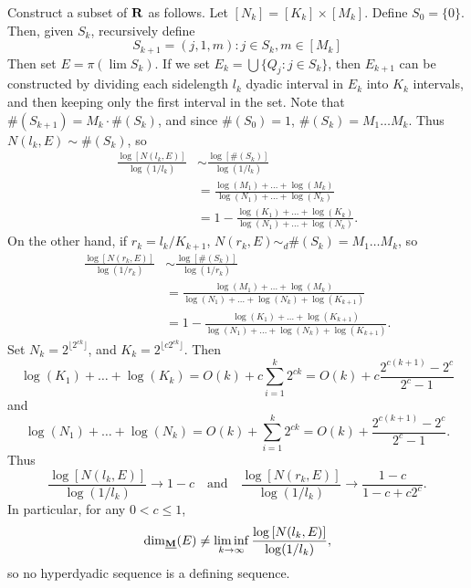 \begin{example}
	Construct a subset of $\operatorname{\mathbf{R}}$ as follows. Let $[N_k] = [K_k] \times [M_k]$. Define $S_0 = \{ 0 \}$. Then, given $S_k$, recursively define
	\[ S_{k+1} = (j,1,m) : j \in S_k, m \in [M_k] \]
	Then set $E = \pi(\lim S_k)$. If we set $E_k = \bigcup \{ Q_j : j \in S_k \}$, then $E_{k+1}$ can be constructed by dividing each sidelength $l_k$ dyadic interval in $E_k$ into $K_k$ intervals, and then keeping only the first interval in the set. Note that $\#(S_{k+1}) = M_k \cdot \#(S_k)$, and since $\#(S_0) = 1$, $\#(S_k) = M_1 \dots M_k$. Thus $N(l_k,E) \sim \#(S_k)$, so
	\begin{align*}
		\frac{\log \left[ N(l_k,E) \right]}{\log(1/l_k)} &\sim \frac{\log \left[ \#(S_k) \right]}{\log(1/l_k)}\\
		&= \frac{\log(M_1) + \dots + \log(M_k)}{\log(N_1) + \dots + \log(N_k)}\\
		&= 1 - \frac{\log(K_1) + \dots + \log(K_k)}{\log(N_1) + \dots + \log(N_k)}.
	\end{align*}
	On the other hand, if $r_k = l_k/K_{k+1}$, $N(r_k,E) \sim_d \#(S_k) = M_1 \dots M_k$, so
	\begin{align*}
		\frac{\log \left[ N(r_k,E) \right]}{\log(1/r_k)} &\sim \frac{\log \left[ \#(S_k) \right]}{\log(1/r_k)}\\
		&= \frac{\log(M_1) + \dots + \log(M_k)}{\log(N_1) + \dots + \log(N_k) + \log(K_{k+1})}\\
		&= 1 - \frac{\log(K_1) + \dots + \log(K_{k+1})}{\log(N_1) + \dots + \log(N_k) + \log(K_{k+1})}.
	\end{align*}
	Set $N_k = 2^{\lfloor 2^{ck} \rfloor}$, and $K_k = 2^{\lfloor c 2^{ck} \rfloor}$. Then
	\[ \log(K_1) + \dots + \log(K_k) = O(k) + c \sum_{i = 1}^k 2^{ck} = O(k) + c \frac{2^{c(k+1)} - 2^c}{2^c - 1} \]
	and
	\[ \log(N_1) + \dots + \log(N_k) = O(k) + \sum_{i = 1}^k 2^{ck} = O(k) + \frac{2^{c(k+1)} - 2^c}{2^c - 1}. \]
	Thus
	\[ \frac{\log \left[ N(l_k,E) \right]}{\log(1/l_k)} \to 1 - c \quad \text{and} \quad \frac{\log \left[ N(r_k,E) \right]}{\log(1/l_k)} \to \frac{1 - c}{1 - c + c2^c}. \]
	In particular, for any $0 < c \leq 1$,
	\[ \operatorname{\dim_{\underline{\mathbf{M}}}}(E) \neq \liminf_{k \to \infty} \frac{\log \left[ N(l_k,E) \right]}{\log(1/l_k)}, \]
	so no hyperdyadic sequence is a defining sequence.



\end{example}
